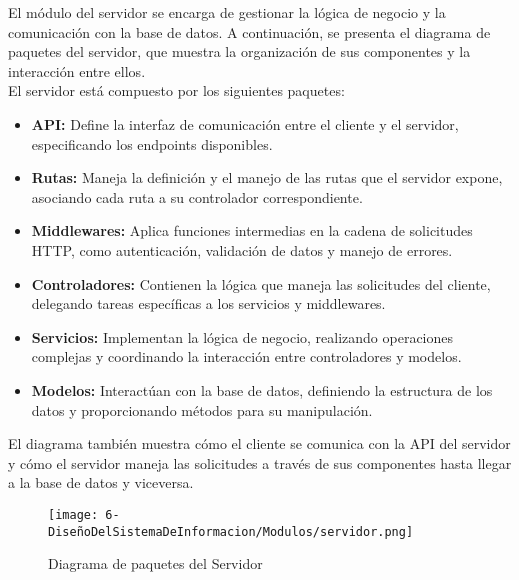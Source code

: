 El módulo del servidor se encarga de gestionar la lógica de negocio y la comunicación con la base de datos. A continuación, se presenta el diagrama de paquetes del servidor, que muestra la organización de sus componentes y la interacción entre ellos.
\\[1ex]
El servidor está compuesto por los siguientes paquetes:
\begin{itemize}
	\item \textbf{API:} Define la interfaz de comunicación entre el cliente y el servidor, especificando los endpoints disponibles.
	\item \textbf{Rutas:} Maneja la definición y el manejo de las rutas que el servidor expone, asociando cada ruta a su controlador correspondiente.
	\item \textbf{Middlewares:} Aplica funciones intermedias en la cadena de solicitudes HTTP, como autenticación, validación de datos y manejo de errores.
	\item \textbf{Controladores:} Contienen la lógica que maneja las solicitudes del cliente, delegando tareas específicas a los servicios y middlewares.
	\item \textbf{Servicios:} Implementan la lógica de negocio, realizando operaciones complejas y coordinando la interacción entre controladores y modelos.
	\item \textbf{Modelos:} Interactúan con la base de datos, definiendo la estructura de los datos y proporcionando métodos para su manipulación.
\end{itemize}

El diagrama también muestra cómo el cliente se comunica con la API del servidor y cómo el servidor maneja las solicitudes a través de sus componentes hasta llegar a la base de datos y viceversa.

\begin{figure}[H]
	\centering
	\texttt{[image: 6-DiseñoDelSistemaDeInformacion/Modulos/servidor.png]}
	\caption{Diagrama de paquetes del Servidor}
\end{figure}